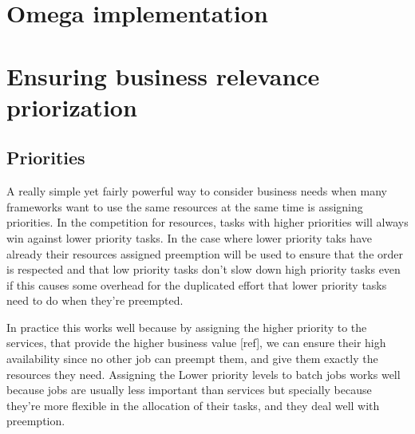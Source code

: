 \documentclass{svjour3}                     %
\begin{document}
\section{Omega implementation}
\label{sec:implementation}



\section{Ensuring business relevance priorization}
\label{sec:businessrelevance}

\subsection{Priorities}

A really simple yet fairly powerful way to consider business needs
when many frameworks want to use the same resources at the same time
is assigning priorities. In the competition for resources, tasks with
higher priorities will always win against lower priority tasks. In the
case where lower priority taks have already their resources assigned
preemption will be used to ensure that the order is respected and that
low priority tasks don't slow down high priority tasks even if this
causes some overhead for the duplicated effort that lower priority
tasks need to do when they're preempted.

In practice this works well because by assigning the higher priority
to the services, that provide the higher business value [ref], we can
ensure their high availability since no other job can preempt them,
and give them exactly the resources they need. Assigning the Lower
priority levels to batch jobs works well because jobs are usually less
important than services but specially because they're more flexible in
the allocation of their tasks, and they deal well with preemption.




\end{document}
